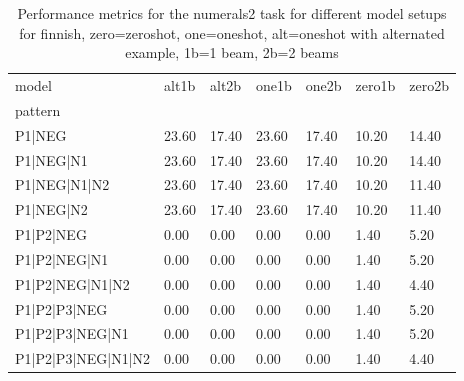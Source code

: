 \begin{table}[h]
\begin{tabular}{l|llllll}
\toprule
model & alt1b & alt2b & one1b & one2b & zero1b & zero2b \\
pattern &  &  &  &  &  &  \\
\midrule
P1|NEG & 23.60 & 17.40 & 23.60 & 17.40 & 10.20 & 14.40 \\
P1|NEG|N1 & 23.60 & 17.40 & 23.60 & 17.40 & 10.20 & 14.40 \\
P1|NEG|N1|N2 & 23.60 & 17.40 & 23.60 & 17.40 & 10.20 & 11.40 \\
P1|NEG|N2 & 23.60 & 17.40 & 23.60 & 17.40 & 10.20 & 11.40 \\
P1|P2|NEG & 0.00 & 0.00 & 0.00 & 0.00 & 1.40 & 5.20 \\
P1|P2|NEG|N1 & 0.00 & 0.00 & 0.00 & 0.00 & 1.40 & 5.20 \\
P1|P2|NEG|N1|N2 & 0.00 & 0.00 & 0.00 & 0.00 & 1.40 & 4.40 \\
P1|P2|P3|NEG & 0.00 & 0.00 & 0.00 & 0.00 & 1.40 & 5.20 \\
P1|P2|P3|NEG|N1 & 0.00 & 0.00 & 0.00 & 0.00 & 1.40 & 5.20 \\
P1|P2|P3|NEG|N1|N2 & 0.00 & 0.00 & 0.00 & 0.00 & 1.40 & 4.40 \\
\bottomrule
\end{tabular}
\caption{Performance metrics for the numerals2 task for different model setups for finnish, zero=zeroshot, one=oneshot, alt=oneshot with alternated example, 1b=1 beam, 2b=2 beams}
\label{tab:fi_numerals2_performance}
\end{table}
